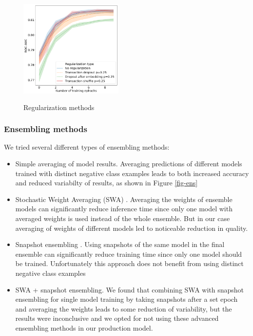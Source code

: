 \documentclass[sigconf]{acmart}
\begin{document}
\begin{figure}[ht]
  \caption{Regularization methods}
  \includegraphics[width=0.46\textwidth]{figures/do-pic.png}
  \label{fig-reg}
\end{figure}


\subsubsection{Ensembling methods} \label{sec-ens}

We tried several different types of ensembling methods:
\begin{itemize}
\item Simple averaging of model results. Averaging predictions of different models trained with distinct negative class examples leads to both increased accuracy and reduced variabilty of results, as shown in Figure \ref{fig-ens}
\item Stochastic Weight Averaging (SWA) \cite{DBLP:journals/corr/LoshchilovH16a}.  Averaging the weights of ensemble models can significantly reduce inference time since only one model with averaged weights is used instead of the whole ensemble. But in our case averaging of weights of different models led to noticeable reduction in quality.
\item Snapshot ensembling \cite{DBLP:journals/corr/HuangLPLHW17}. Using snapshots of the same model in the final ensemble can significantly reduce training time since only one model should be trained. Unfortunately this approach does not benefit from using distinct negative class examples 
\item SWA + snapshot ensembling. We found that combining SWA with snapshot ensembling for single model training by taking snapshots after a set epoch and averaging the weights leads to some reduction of variability, but the results were inconclusive and we opted for not using these advanced ensembling methods in our production model.
\end{itemize}
\end{document}
